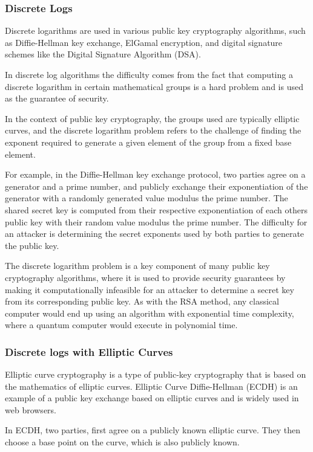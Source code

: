 \documentclass{article}
\begin{document}
\subsubsection{Discrete Logs}
Discrete logarithms are used in various public key cryptography algorithms, such as Diffie-Hellman key exchange, ElGamal encryption, and digital signature schemes like the Digital Signature Algorithm (DSA).

In discrete log algorithms the difficulty comes from the fact that computing a discrete logarithm in certain mathematical groups is a hard problem and is used as the guarantee of security.

In the context of public key cryptography, the groups used are typically elliptic curves, and the discrete logarithm problem refers to the challenge of finding the exponent required to generate a given element of the group from a fixed base element.

For example, in the Diffie-Hellman key exchange protocol, two parties agree on a generator and a prime number, and publicly exchange their exponentiation of the generator with a randomly generated value modulus the prime number. The shared secret key is computed from their respective exponentiation of each others public key with their random value modulus the prime number. The difficulty for an attacker is determining the secret exponents used by both parties to generate the public key.

The discrete logarithm problem is a key component of many public key cryptography algorithms, where it is used to provide security guarantees by making it computationally infeasible for an attacker to determine a secret key from its corresponding public key. As with the RSA method, any classical computer would end up using an algorithm with exponential time complexity, where a quantum computer would execute in polynomial time.

\subsubsection{Discrete logs with Elliptic Curves}
Elliptic curve cryptography is a type of public-key cryptography that is based on the mathematics of elliptic curves. Elliptic Curve Diffie-Hellman (ECDH) is an example of a public key exchange based on elliptic curves and is widely used in web browsers.

In ECDH, two parties, first agree on a publicly known elliptic curve. They then choose a base point on the curve, which is also publicly known.
\end{document}
